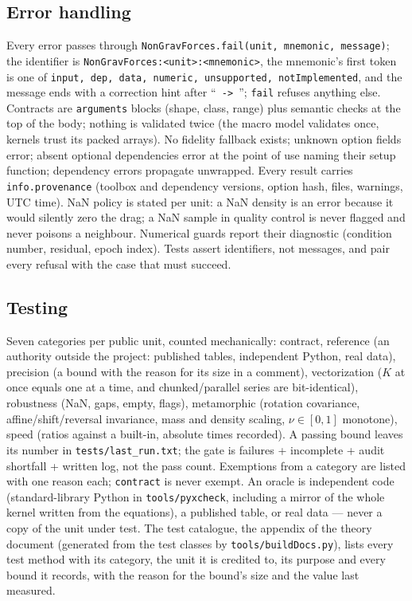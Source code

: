 \subsection{Error handling}
Every error passes through \texttt{NonGravForces.fail(unit, mnemonic, message)}; the identifier is \texttt{NonGravForces:<unit>:<mnemonic>}, the mnemonic's first token is one of \texttt{input, dep, data, numeric, unsupported, notImplemented}, and the message ends with a correction hint after ``\texttt{ -> }''; \texttt{fail} refuses anything else. Contracts are \texttt{arguments} blocks (shape, class, range) plus semantic checks at the top of the body; nothing is validated twice (the macro model validates once, kernels trust its packed arrays). No fidelity fallback exists; unknown option fields error; absent optional dependencies error at the point of use naming their setup function; dependency errors propagate unwrapped. Every result carries \texttt{info.provenance} (toolbox and dependency versions, option hash, files, warnings, UTC time). NaN policy is stated per unit: a NaN density is an error because it would silently zero the drag; a NaN sample in quality control is never flagged and never poisons a neighbour. Numerical guards report their diagnostic (condition number, residual, epoch index). Tests assert identifiers, not messages, and pair every refusal with the case that must succeed.

\subsection{Testing}
Seven categories per public unit, counted mechanically: contract, reference (an authority outside the project: published tables, independent Python, real data), precision (a bound with the reason for its size in a comment), vectorization ($K$ at once equals one at a time, and chunked/parallel series are bit-identical), robustness (NaN, gaps, empty, flags), metamorphic (rotation covariance, affine/shift/reversal invariance, mass and density scaling, $\nu\in[0,1]$ monotone), speed (ratios against a built-in, absolute times recorded). A passing bound leaves its number in \texttt{tests/last\_run.txt}; the gate is failures + incomplete + audit shortfall + written log, not the pass count. Exemptions from a category are listed with one reason each; \texttt{contract} is never exempt. An oracle is independent code (standard-library Python in \texttt{tools/pyxcheck}, including a mirror of the whole kernel written from the equations), a published table, or real data --- never a copy of the unit under test. The test catalogue, the appendix of the theory document (generated from the test classes by \texttt{tools/buildDocs.py}), lists every test method with its category, the unit it is credited to, its purpose and every bound it records, with the reason for the bound's size and the value last measured.

